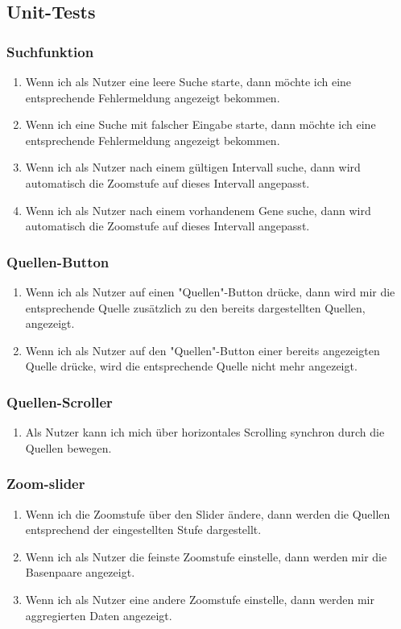 \subsection{Unit-Tests}
\subsubsection{Suchfunktion}
\begin{enumerate}
	\item Wenn ich als Nutzer eine leere Suche starte, dann möchte ich eine entsprechende Fehlermeldung angezeigt bekommen.
	\item Wenn ich eine Suche mit falscher Eingabe starte, dann möchte ich eine entsprechende Fehlermeldung angezeigt bekommen.
	\item Wenn ich als Nutzer nach einem gültigen Intervall suche, dann wird automatisch die Zoomstufe auf dieses Intervall angepasst.
	\item Wenn ich als Nutzer nach einem vorhandenem Gene suche, dann wird automatisch die Zoomstufe auf dieses Intervall angepasst.
\end{enumerate}


\subsubsection{Quellen-Button}
\begin{enumerate}
	\item Wenn ich als Nutzer auf einen "Quellen"-Button drücke, dann wird mir die entsprechende Quelle zusätzlich zu den bereits dargestellten Quellen, angezeigt.
	\item Wenn ich als Nutzer auf den "Quellen"-Button einer bereits angezeigten Quelle drücke, wird die entsprechende Quelle nicht mehr angezeigt.
\end{enumerate}

\subsubsection{Quellen-Scroller}
\begin{enumerate}
	\item Als Nutzer kann ich mich über horizontales Scrolling synchron durch die Quellen bewegen.
\end{enumerate}

\subsubsection{Zoom-slider}
\begin{enumerate}
	\item Wenn ich die Zoomstufe über den Slider ändere, dann werden die Quellen entsprechend der eingestellten Stufe dargestellt.
	\item Wenn ich als Nutzer die feinste Zoomstufe einstelle, dann werden mir die Basenpaare angezeigt.
	\item Wenn ich als Nutzer eine andere Zoomstufe einstelle, dann werden mir aggregierten Daten angezeigt.
\end{enumerate}


